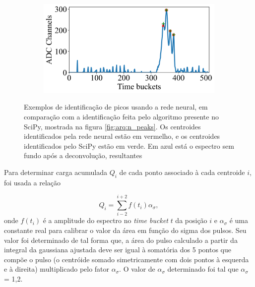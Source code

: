 \documentclass[a4paper,12pt,oneside]{book}
\begin{document}
\begin{figure}[H]
\begin{subfigure}[b]{0.49\textwidth}
        \caption{}
        \label{subfig:exs_n_peaks_3}
    \end{subfigure}%
    \hfill
    \begin{subfigure}[b]{0.465\textwidth}
        \centering
        \includegraphics[scale=0.425]{figs/np_exs4.png}
        \caption{}
        \label{subfig:exs_n_peaks_4}
    \end{subfigure}
\caption{Exemplos de identificação de picos usando a rede neural, em comparação com a identificação feita pelo algoritmo presente no SciPy, mostrada na figura \ref{fig:arq:n_peaks}. Os centroides identificados pela rede neural estão em vermelho, e os centroides identificados pelo SciPy estão em verde. Em azul está o espectro sem fundo após a deconvolução, resultantes }
\label{fig:exs_n_peaks}
\end{figure}

\par Para determinar carga acumulada $Q_i$ de cada ponto associado à cada centroide $i$, foi usada a relação

\begin{equation}\label{eq:carga_acumulada_ml}
	Q_i = \sum_{i - 2}^{i + 2}f(t_i)\alpha_\sigma,
\end{equation}
%
onde $f(t_i)$ é a amplitude do espectro no \textit{time bucket} $t$ da posição $i$ e $\alpha_\sigma$ é uma constante real para calibrar o valor da área em função do sigma dos pulsos. Seu valor foi determinado de tal forma que, a área do pulso calculado a partir da integral da gaussiana ajustada deve ser igual à somatória dos 5 pontos que compõe o pulso (o centróide somado simetricamente com dois pontos à esquerda e à direita) multiplicado pelo fator $\alpha_\sigma$. O valor de $\alpha_\sigma$ determinado foi tal que $\alpha_\sigma$  = 1,2.

\end{document}

